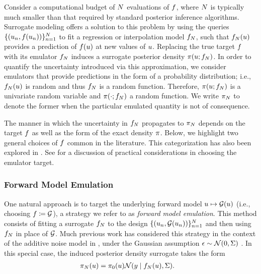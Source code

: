 \documentclass[12pt]{article}
\begin{document}
Consider a computational budget of $N$ evaluations of $f$, where 
$N$ is typically much smaller than that required by standard posterior
inference algorithms. Surrogate modeling offers a solution to this problem 
by using the queries $\{(u_n, f(u_n))\}_{n=1}^{N}$ to 
fit a regression or interpolation model $f_{N}$, such that $f_{N}(u)$
provides a prediction of $f(u)$ at new values of $u$.
Replacing the true target $f$ with its emulator $f_{N}$ induces a 
surrogate posterior density $\pi(u; f_{N})$. In order to quantify
the uncertainty introduced via this approximation, we consider emulators 
that provide predictions in the form of a probability distribution; 
i.e., $f_{N}(u)$ is random and thus $f_{N}$ is a random function. 
Therefore, $\pi(u; f_{N})$
is a univariate random variable and $\pi(\cdot; f_{N})$ a random 
function. We write $\pi_{N}$ to denote the former when the particular 
emulated quantity is not of consequence.

The manner in which the uncertainty in $f_{N}$ propagates to $\pi_{N}$
depends on the target $f$ as well as the form of the exact density 
$\pi$. Below, we highlight two general choices of $f$ common 
in the literature. This categorization has also 
been explored in \citet{StuartTeck1,StuartTeck2,GP_PDE_priors}. See
\citet{reviewPaper} for a discussion of practical considerations in choosing 
the emulator target. 

\subsubsection{Forward Model Emulation}
One natural approach is to target the underlying forward model 
$u \mapsto \mathcal{G}(u)$ (i.e., choosing $f \coloneqq \mathcal{G}$), a strategy 
we refer to as \textit{forward model emulation}.
This method consists of fitting a surrogate $f_{N}$ to the design 
$\{(u_n, \mathcal{G}(u_n))\}_{n=1}^{N}$ and then using $f_{N}$
in place of $\mathcal{G}$. Much previous work has considered this strategy 
in the context of the additive noise model in ,
under the Gaussian assumption $\epsilon \sim \mathcal{N}(0, \Sigma)$
\citep{StuartTeck1,GP_PDE_priors,hydrologicalModel,hydrologicalModel2,
Surer2023sequential,VillaniAdaptiveGP,weightedIVAR,idealizedGCM,CES}.
In this special case, the induced posterior density surrogate takes the form
\begin{align}
\pi_{N}(u) &= \pi_0(u) \mathcal{N}(y \mid f_{N}(u), \Sigma). \label{eq:post-em-fwd-Gaussian}
\end{align}
\end{document}
